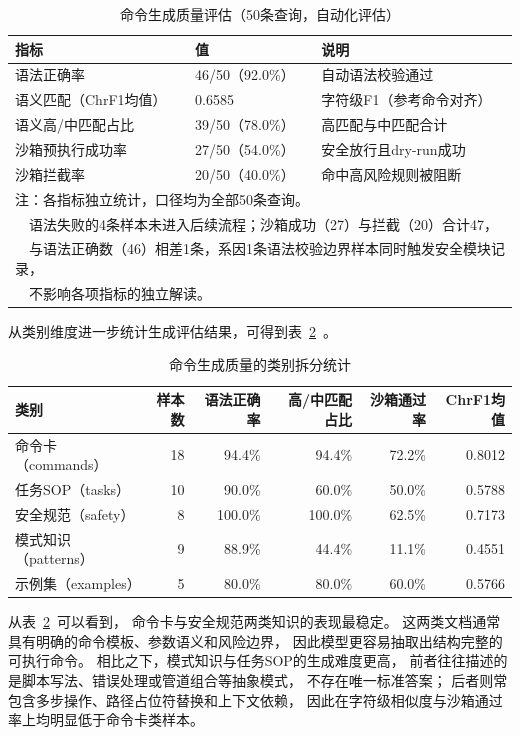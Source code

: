 \begin{table}[htbp]
\centering
\caption{命令生成质量评估（50条查询，自动化评估）}
\label{tab:gen-quality}
\begin{tabular}{lll}
\toprule
指标 & 值 & 说明 \\
\midrule
语法正确率 & 46/50（92.0\%） & 自动语法校验通过 \\
语义匹配（ChrF1均值） & 0.6585 & 字符级F1（参考命令对齐） \\
语义高/中匹配占比 & 39/50（78.0\%） & 高匹配与中匹配合计 \\
沙箱预执行成功率 & 27/50（54.0\%） & 安全放行且dry-run成功 \\
沙箱拦截率 & 20/50（40.0\%） & 命中高风险规则被阻断 \\
\bottomrule
\multicolumn{3}{l}{\footnotesize 注：各指标独立统计，口径均为全部50条查询。} \\
\multicolumn{3}{l}{\footnotesize ~~语法失败的4条样本未进入后续流程；沙箱成功（27）与拦截（20）合计47，} \\
\multicolumn{3}{l}{\footnotesize ~~与语法正确数（46）相差1条，系因1条语法校验边界样本同时触发安全模块记录，} \\
\multicolumn{3}{l}{\footnotesize ~~不影响各项指标的独立解读。} \\
\end{tabular}
\end{table}

从类别维度进一步统计生成评估结果，可得到表~\ref{tab:gen-quality-category}~。

\begin{table}[htbp]
\centering
\caption{命令生成质量的类别拆分统计}
\label{tab:gen-quality-category}
\begin{tabular}{lrrrrr}
\toprule
类别 & 样本数 & 语法正确率 & 高/中匹配占比 & 沙箱通过率 & ChrF1均值 \\
\midrule
命令卡（commands） & 18 & 94.4\% & 94.4\% & 72.2\% & 0.8012 \\
任务SOP（tasks） & 10 & 90.0\% & 60.0\% & 50.0\% & 0.5788 \\
安全规范（safety） & 8 & 100.0\% & 100.0\% & 62.5\% & 0.7173 \\
模式知识（patterns） & 9 & 88.9\% & 44.4\% & 11.1\% & 0.4551 \\
示例集（examples） & 5 & 80.0\% & 80.0\% & 60.0\% & 0.5766 \\
\bottomrule
\end{tabular}
\end{table}

从表~\ref{tab:gen-quality-category}~可以看到，
命令卡与安全规范两类知识的表现最稳定。
这两类文档通常具有明确的命令模板、参数语义和风险边界，
因此模型更容易抽取出结构完整的可执行命令。
相比之下，模式知识与任务SOP的生成难度更高，
前者往往描述的是脚本写法、错误处理或管道组合等抽象模式，
不存在唯一标准答案；
后者则常包含多步操作、路径占位符替换和上下文依赖，
因此在字符级相似度与沙箱通过率上均明显低于命令卡类样本。

